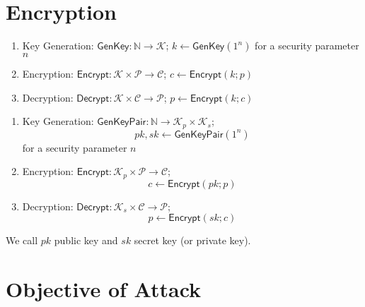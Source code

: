 \documentclass[12pt,openany]{book}
\theoremstyle{definition}
\newcommand{\N}{\mathbb{N}}
\newcommand{\GenKey}{\mathsf{GenKey}}
\newcommand{\GenKeyPair}{\mathsf{GenKeyPair}}
\newcommand{\Encrypt}{\mathsf{Encrypt}}
\newcommand{\Decrypt}{\mathsf{Decrypt}}
\begin{document}
	\section{Encryption}
	\begin{tcolorbox}[colback=white,colframe=defcolor,arc=5pt,title={\color{white}\bf Symmetric Key Encryption}]
		\begin{enumerate}[(1)]
			\item Key Generation: $\GenKey:\N\to\mathcal{K}$; $k\gets\GenKey(1^n)$ for a security parameter $n$
			\item Encryption: $\Encrypt:\mathcal{K}\times\mathcal{P}\to\mathcal{C}$; $c\gets\Encrypt(k;p)$
			\item Decryption: $\Decrypt:\mathcal{K}\times\mathcal{C}\to\mathcal{P}$; $p\gets\Encrypt(k;c)$
		\end{enumerate}
	\end{tcolorbox}
	\vspace{8pt}
	\begin{tcolorbox}[colback=white,colframe=defcolor,arc=5pt,title={\color{white}\bf Public Key Encryption}]
		\begin{enumerate}[(1)]
			\item Key Generation: $\GenKeyPair:\N\to\mathcal{K}_p\times\mathcal{K}_s$; \[
			pk,sk\gets\GenKeyPair(1^n)
			\] for a security parameter $n$
			\item Encryption: $\Encrypt:\mathcal{K}_p\times\mathcal{P}\to\mathcal{C}$;
			$$c\gets\Encrypt(pk;p)$$
			\item Decryption: $\Decrypt:\mathcal{K}_s\times\mathcal{C}\to\mathcal{P}$;
			$$p\gets\Encrypt(sk;c)$$
		\end{enumerate} We call $pk$ public key and $sk$ secret key (or private key).
	\end{tcolorbox}

	\newpage
	\section{Objective of Attack}
\end{document}
